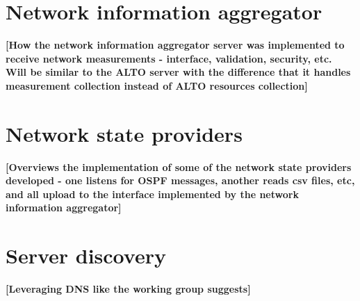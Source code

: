 \section{Network information aggregator}

    \textbf{[How the network information aggregator server was implemented to receive network measurements - interface, validation, security, etc. Will be similar to the ALTO server with the difference that it handles measurement collection instead of ALTO resources collection]}

\section{Network state providers}

    \textbf{[Overviews the implementation of some of the network state providers developed - one listens for OSPF messages, another reads csv files, etc, and all upload to the interface implemented by the network information aggregator]}

\section{Server discovery}
    \textbf{[Leveraging DNS like the working group suggests]}


